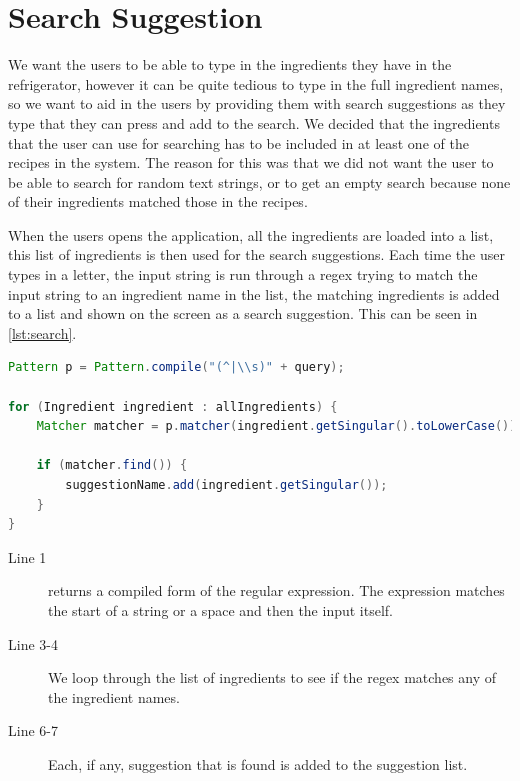 \section{Search Suggestion}
We want the users to be able to type in the ingredients they have in the refrigerator, however it can be quite tedious to type in the full ingredient names, so we want to aid in the users by providing them with search suggestions as they type that they can press and add to the search. We decided that the ingredients that the user can use for searching has to be included in at least one of the recipes in the system. The reason for this was that we did not want the user to be able to search for random text strings, or to get an empty search because none of their ingredients matched those in the recipes. 

When the users opens the application, all the ingredients are loaded into a list, this list of ingredients is then used for the search suggestions. Each time the user types in a letter, the input string is run through a regex trying to match the input string to an ingredient name in the list, the matching ingredients is added to a list and shown on the screen as a search suggestion. This can be seen in \autoref{lst:search}.

\begin{lstlisting}[language=java, label=lst:search, caption={Search suggestions}]
Pattern p = Pattern.compile("(^|\\s)" + query);

for (Ingredient ingredient : allIngredients) {
    Matcher matcher = p.matcher(ingredient.getSingular().toLowerCase());

    if (matcher.find()) {
        suggestionName.add(ingredient.getSingular());
    }
}
\end{lstlisting}

\begin{description}
\item[Line 1]  returns a compiled form of the regular expression. The expression matches the start of a string or a space and then the input itself. 
\item[Line 3-4] We loop through the list of ingredients to see if the regex matches any of the ingredient names.
\item[Line 6-7] Each, if any, suggestion that is found is added to the suggestion list.
\end{description}

